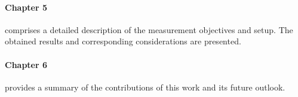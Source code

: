 \paragraph{Chapter 5} comprises a detailed description of the measurement objectives and setup. The obtained results and corresponding considerations are presented.
\paragraph{Chapter 6} provides a summary of the contributions of this work and its future outlook.

